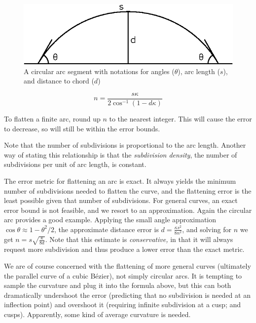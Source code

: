 \documentclass[sigconf]{acmart}
\begin{document}
\begin{figure}
    \includegraphics[scale=0.5]{arc_chord}
    \caption{A circular arc segment with notations for angles ($\theta$), arc length ($s$), and distance to chord ($d$)}
    \label{fig:arc_chord}
\end{figure}


\[
n = \frac{s\kappa}{2\cos^{-1}\left( 1- d\kappa \right)}
\]

To flatten a finite arc, round up $n$ to the nearest integer. This will cause the error to decrease, so will still be within the error bounds.

Note that the number of subdivisions is proportional to the arc length. Another way of stating this relationship is that the \emph{subdivision density}, the number of subdivisions per unit of arc length, is constant.

The error metric for flattening an arc is exact. It always yields the minimum number of subdivisions needed to flatten the curve, and the flattening error is the least possible given that number of subdivisions. For general curves, an exact error bound is not feasible, and we resort to an approximation. Again the circular arc provides a good example. Applying the small angle approximation $\cos \theta \approx 1 - \theta^2/2$, the approximate distance error is $d = \frac{\kappa s^2}{8n^2}$, and solving for $n$ we get $n = s\sqrt{\frac{\kappa}{8d}}$. Note that this estimate is \emph{conservative,} in that it will always request more subdivision and thus produce a lower error than the exact metric.

We are of course concerned with the flattening of more general curves (ultimately the parallel curve of a cubic Bézier), not simply circular arcs. It is tempting to sample the curvature and plug it into the formula above, but this can both dramatically undershoot the error (predicting that no subdivision is needed at an inflection point) and overshoot it (requiring infinite subdivision at a cusp; and cusps). Apparently, some kind of average curvature is needed.
\end{document}
